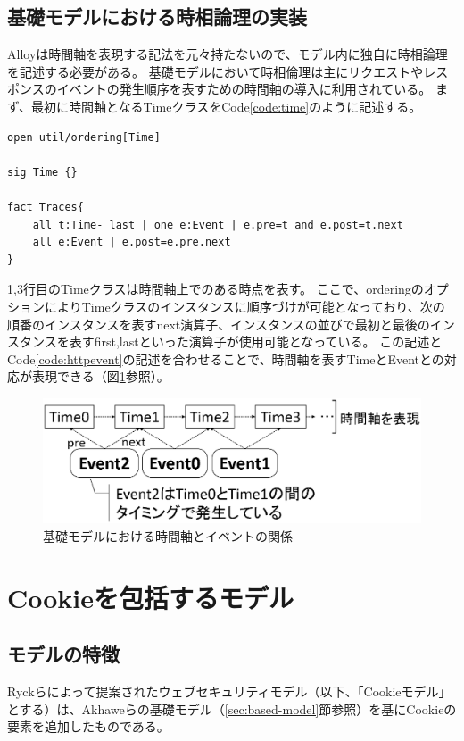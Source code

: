 \documentclass[12pt,a4paper]{jbook}
\begin{document}
\subsection{基礎モデルにおける時相論理の実装}
\label{sec:based-model-temporal-logic}
Alloyは時間軸を表現する記法を元々持たないので、モデル内に独自に時相論理を記述する必要がある。
基礎モデルにおいて時相倫理は主にリクエストやレスポンスのイベントの発生順序を表すための時間軸の導入に利用されている。
まず、最初に時間軸となるTimeクラスをCode\ref{code:time}のように記述する。
\begin{lstlisting}[caption=基礎モデルにおける時間軸, label=code:time]
open util/ordering[Time]

sig Time {}

fact Traces{
	all t:Time- last | one e:Event | e.pre=t and e.post=t.next
	all e:Event | e.post=e.pre.next
}
\end{lstlisting}
1,3行目のTimeクラスは時間軸上でのある時点を表す。
ここで、orderingのオプションによりTimeクラスのインスタンスに順序づけが可能となっており、次の順番のインスタンスを表すnext演算子、インスタンスの並びで最初と最後のインスタンスを表すfirst,lastといった演算子が使用可能となっている。
この記述とCode\ref{code:httpevent}の記述を合わせることで、時間軸を表すTimeとEventとの対応が表現できる（図\ref{fig:based-model-temporal-logic}参照）。

\begin{figure}[htb]
\centering
\includegraphics[width=400pt]{./fig/based-model-temporal-logic.eps}
\caption{基礎モデルにおける時間軸とイベントの関係}
\label{fig:based-model-temporal-logic}
\end{figure}

\section{Cookieを包括するモデル}
\label{sec:cookie-model}
\subsection{モデルの特徴}
Ryckらによって提案されたウェブセキュリティモデル\cite{cookie-model}（以下、「Cookieモデル」とする）は、Akhaweらの基礎モデル（\ref{sec:based-model}節参照）を基にCookieの要素を追加したものである。
\end{document}
